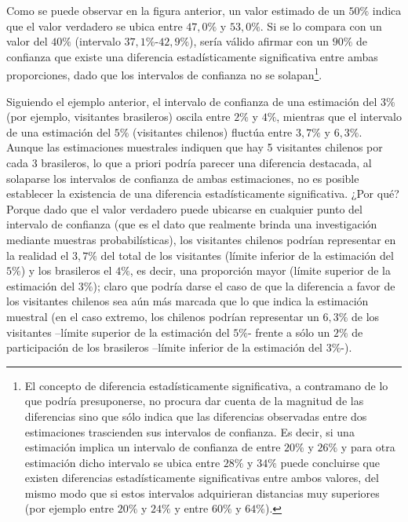 \documentclass[
]{book}
\begin{document}
Como se puede observar en la figura anterior, un valor estimado de un \(50\%\) indica que el valor verdadero se ubica entre \(47,0\%\) y \(53,0\%\). Si se lo compara con un valor del \(40\%\) (intervalo \(37,1\%\)-\(42,9\%\)), sería válido afirmar con un \(90\%\) de confianza que existe una diferencia estadísticamente significativa entre ambas proporciones, dado que los intervalos de confianza no se solapan\footnote{El concepto de diferencia estadísticamente significativa, a contramano de lo que podría presuponerse, no procura dar cuenta de la magnitud de las diferencias sino que sólo indica que las diferencias observadas entre dos estimaciones trascienden sus intervalos de confianza. Es decir, si una estimación implica un intervalo de confianza de entre \(20\%\) y \(26\%\) y para otra estimación dicho intervalo se ubica entre \(28\%\) y \(34\%\) puede concluirse que existen diferencias estadísticamente significativas entre ambos valores, del mismo modo que si estos intervalos adquirieran distancias muy superiores (por ejemplo entre \(20\%\) y \(24\%\) y entre \(60\%\) y \(64\%\)).}.

Siguiendo el ejemplo anterior, el intervalo de confianza de una estimación del \(3\%\) (por ejemplo, visitantes brasileros) oscila entre \(2\%\) y \(4\%\), mientras que el intervalo de una estimación del \(5\%\) (visitantes chilenos) fluctúa entre \(3,7\%\) y \(6,3\%\). Aunque las estimaciones muestrales indiquen que hay 5 visitantes chilenos por cada 3 brasileros, lo que a priori podría parecer una diferencia destacada, al solaparse los intervalos de confianza de ambas estimaciones, no es posible establecer la existencia de una diferencia estadísticamente significativa. ¿Por qué? Porque dado que el valor verdadero puede ubicarse en cualquier punto del intervalo de confianza (que es el dato que realmente brinda una investigación mediante muestras probabilísticas), los visitantes chilenos podrían representar en la realidad el \(3,7\%\) del total de los visitantes (límite inferior de la estimación del \(5\%\)) y los brasileros el \(4\%\), es decir, una proporción mayor (límite superior de la estimación del \(3\%\)); claro que podría darse el caso de que la diferencia a favor de los visitantes chilenos sea aún más marcada que lo que indica la estimación muestral (en el caso extremo, los chilenos podrían representar un \(6,3\%\) de los visitantes --límite superior de la estimación del \(5\%\)- frente a sólo un \(2\%\) de participación de los brasileros --límite inferior de la estimación del \(3\%\)-).
\end{document}
